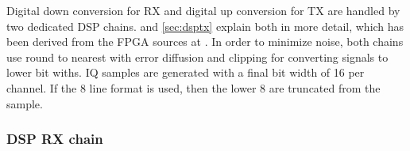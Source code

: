 \documentclass[12pt,a4paper,parskip=full]{scrartcl}
\begin{document}
Digital down conversion for RX and digital up conversion for TX are handled by two dedicated DSP chains.
 and \cref{sec:dsptx} explain both in more detail, which has been derived from the FPGA sources at \cite{usrp_src}.
In order to minimize noise, both chains use round to nearest with error diffusion and clipping
for converting signals to lower bit withs. IQ samples are generated with a final bit width of
\SI{16}{\bit} per channel. If the \SI{8}{\bit} line format is used, then the lower \SI{8}{\bit}
are truncated from the sample.
\subsubsection{DSP RX chain}
\label{sec:dsprx}
\begin{figure}[htb]
    \centering
{}
\end{figure}
\end{document}
